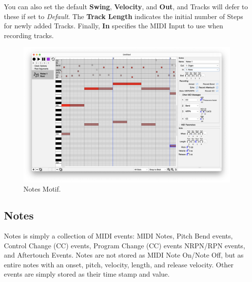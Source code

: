 \documentclass[twoside,10pt]{article}
\newcommand\ignore[1]{}
\begin{document}
You can also set the default {\bf Swing}, {\bf Velocity}, and {\bf Out}, and Tracks will defer to these if set to {\it Default}.  The {\bf Track Length} indicates the initial number of Steps for newly added Tracks. Finally, {\bf In} specifies the MIDI Input to use when recording tracks.

\ignore{
\paragraph{Recording a Step Sequence}

If you arm one or more Tracks, set their Notes, and set the Sequence's MIDI Input accordingly, then you can record in Notes to those tracks when you press Record on Seq.   You will find this easier if you turn on the metronome and if you set the Step Sequence to be the Root, so it records immediately.  Remember that if your Step Sequence motif is not a descendant of the Root, it will never be reached to do Recording.
}

\clearpage

\begin{figure}[t]
\centering
\includegraphics[width=6.5in]{Notes}
\vspace{-2em}
\caption{Notes Motif.}
\label{notes}
\end{figure}

\subsection{Notes}
 
Notes is simply a collection of MIDI events: MIDI Notes, Pitch Bend events, Control Change (CC) events, Program Change (CC) events NRPN/RPN events, and Aftertouch Events.  Notes are not stored as MIDI Note On/Note Off, but as entire notes with an onset, pitch, velocity, length, and release velocity.   Other events are simply stored as their time stamp and value.  
\end{document}
